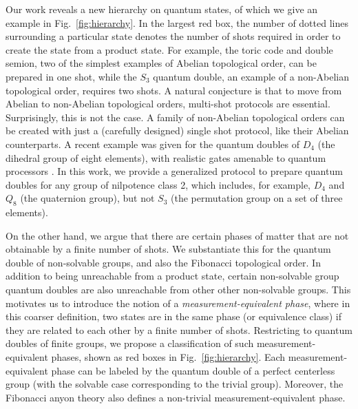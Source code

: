 \documentclass[nofootinbib,prx,twocolumn,showpacs,superscriptaddress,notitlepage,amsmath,amssymb]{revtex4-2}
\theoremstyle{definition}
\begin{document}
Our work reveals a new hierarchy on quantum states, of which we give an example in Fig.~\ref{fig:hierarchy}. In the largest red box, the number of dotted lines surrounding a particular state denotes the number of shots required in order to create the state from a product state. For example, the toric code and double semion, two of the simplest examples of Abelian topological order, can be prepared in one shot, while the $S_3$ quantum double, an example of a non-Abelian topological order, requires two shots. A natural conjecture is that to move from Abelian to non-Abelian topological orders, multi-shot protocols are essential. Surprisingly, this is not the case. A family of non-Abelian topological orders can be created with just a (carefully designed) single shot protocol, like their Abelian counterparts. A recent example was given for the quantum doubles of $D_4$ (the dihedral group of eight elements), with realistic gates amenable to quantum processors \cite{oneshot}. In this work, we provide a generalized protocol to prepare quantum doubles for any group of nilpotence class 2, which includes, for example, $D_4$ and $Q_8$ (the quaternion group), but not $S_3$ (the permutation group on a set of three elements). 

On the other hand, we argue that there are certain phases of matter that are not obtainable by a finite number of shots. We substantiate this for the quantum double of non-solvable groups, and also the Fibonacci topological order. In addition to being unreachable from a product state, certain non-solvable group quantum doubles are also unreachable from other other non-solvable groups. This motivates us to introduce the notion of a \textit{measurement-equivalent phase}, where in this coarser definition, two states are in the same phase (or equivalence class) if they are related to each other by a finite number of shots. Restricting to quantum doubles of finite groups, we propose a classification of such measurement-equivalent phases, shown as red boxes in Fig.~\ref{fig:hierarchy}. Each measurement-equivalent phase can be labeled by the quantum double of a perfect centerless group (with the solvable case corresponding to the trivial group). Moreover, the Fibonacci anyon theory also defines a non-trivial measurement-equivalent phase.
\end{document}
